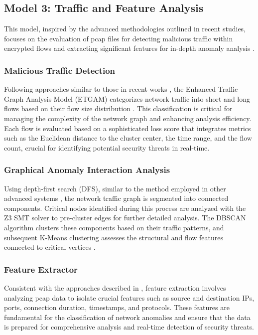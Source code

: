 
\subsection{Model 3: Traffic and Feature Analysis}
This model, inspired by the advanced methodologies outlined in recent studies, focuses on the evaluation of pcap files for detecting malicious traffic within encrypted flows and extracting significant features for in-depth anomaly analysis \cite{24, 26}.

\subsubsection{Malicious Traffic Detection}
Following approaches similar to those in recent works \cite{24, 26}, the Enhanced Traffic Graph Analysis Model (ETGAM) categorizes network traffic into short and long flows based on their flow size distribution \cite{25}. This classification is critical for managing the complexity of the network graph and enhancing analysis efficiency. Each flow is evaluated based on a sophisticated loss score that integrates metrics such as the Euclidean distance to the cluster center, the time range, and the flow count, crucial for identifying potential security threats in real-time.

\subsubsection{Graphical Anomaly Interaction Analysis}
Using depth-first search (DFS), similar to the method employed in other advanced systems \cite{26}, the network traffic graph is segmented into connected components. Critical nodes identified during this process are analyzed with the Z3 SMT solver to pre-cluster edges for further detailed analysis. The DBSCAN algorithm clusters these components based on their traffic patterns, and subsequent K-Means clustering assesses the structural and flow features connected to critical vertices \cite{24, 26}.

\subsubsection{Feature Extractor}
Consistent with the approaches described in \cite{24, 25}, feature extraction involves analyzing pcap data to isolate crucial features such as source and destination IPs, ports, connection duration, timestamps, and protocols. These features are fundamental for the classification of network anomalies and ensure that the data is prepared for comprehensive analysis and real-time detection of security threats.
